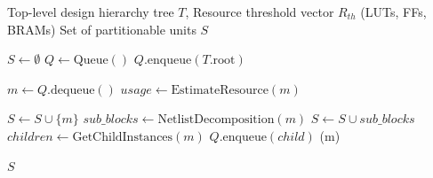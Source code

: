\documentclass{article}
\begin{document}

\begin{algorithm}[hbt!]
    \caption{Resource-Aware Adaptive Granularity Partitioning}
    \label{alg:adaptive_partitioning}
    \begin{algorithmic}[1]
        \Require Top-level design hierarchy tree $T$, Resource threshold vector $R_{th}$ (LUTs, FFs, BRAMs)
        \Ensure Set of partitionable units $S$

        \State $S \gets \emptyset$
        \State $Q \gets \text{Queue}()$
        \State $Q.\text{enqueue}(T.\text{root})$ 

        \State $m \gets Q.\text{dequeue}()$
        \State $usage \gets \text{EstimateResource}(m)$ 

        \State $S \gets S \cup \{m\}$ 
        \Else
        \State {}
        \State $sub\_blocks \gets \text{NetlistDecomposition}(m)$
        \State $S \gets S \cup sub\_blocks$
        \Else
        \State {}
        \State $children \gets \text{GetChildInstances}(m)$
        \State $Q.\text{enqueue}(child)$
        \EndFor
        \State {}(m) 
        \EndIf
        \EndIf
        \EndWhile

        \Return $S$
    \end{algorithmic}
\end{algorithm}
\end{document}
